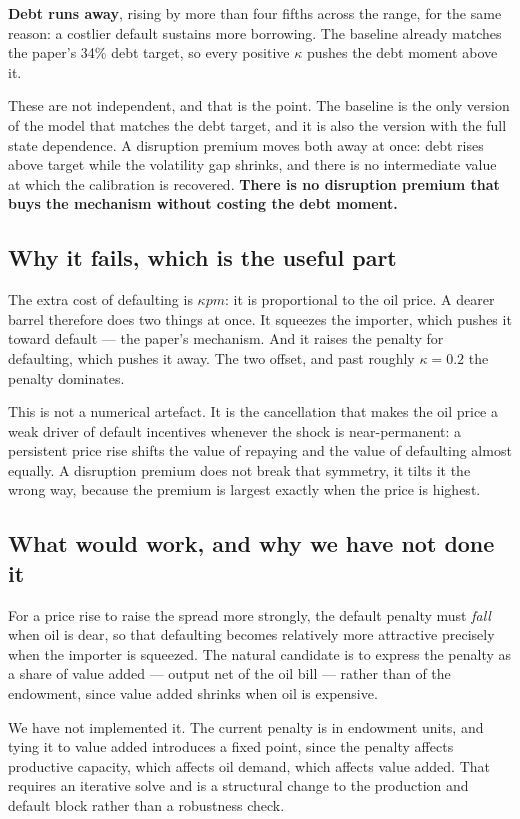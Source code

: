 \textbf{Debt runs away}, rising by more than four fifths across the range, for
the same reason: a costlier default sustains more borrowing. The baseline
already matches the paper's 34\% debt target, so every positive $\kappa$ pushes
the debt moment above it.

These are not independent, and that is the point. The baseline is the only
version of the model that matches the debt target, and it is also the version
with the full state dependence. A disruption premium moves both away at once:
debt rises above target while the volatility gap shrinks, and there is no
intermediate value at which the calibration is recovered. \textbf{There is no
disruption premium that buys the mechanism without costing the debt moment.}

\subsection*{Why it fails, which is the useful part}

The extra cost of defaulting is $\kappa pm$: it is proportional to the oil
price. A dearer barrel therefore does two things at once. It squeezes the
importer, which pushes it toward default --- the paper's mechanism. And it
raises the penalty for defaulting, which pushes it away. The two offset, and
past roughly $\kappa = 0.2$ the penalty dominates.

This is not a numerical artefact. It is the cancellation that makes the oil
price a weak driver of default incentives whenever the shock is near-permanent:
a persistent price rise shifts the value of repaying and the value of defaulting
almost equally. A disruption premium does not break that symmetry, it tilts it
the wrong way, because the premium is largest exactly when the price is highest.

\subsection*{What would work, and why we have not done it}

For a price rise to raise the spread more strongly, the default penalty must
\emph{fall} when oil is dear, so that defaulting becomes relatively more
attractive precisely when the importer is squeezed. The natural candidate is to
express the penalty as a share of value added --- output net of the oil bill ---
rather than of the endowment, since value added shrinks when oil is expensive.

We have not implemented it. The current penalty is in endowment units, and
tying it to value added introduces a fixed point, since the penalty affects
productive capacity, which affects oil demand, which affects value added. That
requires an iterative solve and is a structural change to the production and
default block rather than a robustness check.

